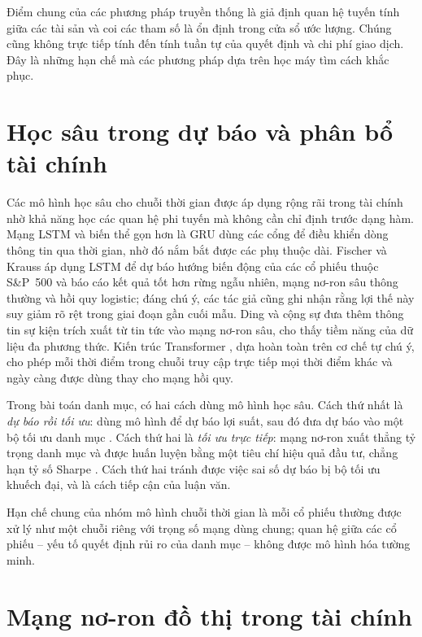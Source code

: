 Điểm chung của các phương pháp truyền thống là giả định quan hệ tuyến tính giữa các tài sản và coi các tham số là ổn định trong cửa sổ ước lượng. Chúng cũng không trực tiếp tính đến tính tuần tự của quyết định và chi phí giao dịch. Đây là những hạn chế mà các phương pháp dựa trên học máy tìm cách khắc phục.

\section{Học sâu trong dự báo và phân bổ tài chính}

Các mô hình học sâu cho chuỗi thời gian được áp dụng rộng rãi trong tài chính nhờ khả năng học các quan hệ phi tuyến mà không cần chỉ định trước dạng hàm. Mạng LSTM \cite{hochreiter1997} và biến thể gọn hơn là GRU \cite{cho2014} dùng các cổng để điều khiển dòng thông tin qua thời gian, nhờ đó nắm bắt được các phụ thuộc dài. Fischer và Krauss \cite{fischer2018} áp dụng LSTM để dự báo hướng biến động của các cổ phiếu thuộc S\&P~500 và báo cáo kết quả tốt hơn rừng ngẫu nhiên, mạng nơ-ron sâu thông thường và hồi quy logistic; đáng chú ý, các tác giả cũng ghi nhận rằng lợi thế này suy giảm rõ rệt trong giai đoạn gần cuối mẫu. Ding và cộng sự \cite{ding2015} đưa thêm thông tin sự kiện trích xuất từ tin tức vào mạng nơ-ron sâu, cho thấy tiềm năng của dữ liệu đa phương thức. Kiến trúc Transformer \cite{vaswani2017}, dựa hoàn toàn trên cơ chế tự chú ý, cho phép mỗi thời điểm trong chuỗi truy cập trực tiếp mọi thời điểm khác và ngày càng được dùng thay cho mạng hồi quy.

Trong bài toán danh mục, có hai cách dùng mô hình học sâu. Cách thứ nhất là \emph{dự báo rồi tối ưu}: dùng mô hình để dự báo lợi suất, sau đó đưa dự báo vào một bộ tối ưu danh mục \cite{ma2023}. Cách thứ hai là \emph{tối ưu trực tiếp}: mạng nơ-ron xuất thẳng tỷ trọng danh mục và được huấn luyện bằng một tiêu chí hiệu quả đầu tư, chẳng hạn tỷ số Sharpe \cite{zhang2020}. Cách thứ hai tránh được việc sai số dự báo bị bộ tối ưu khuếch đại, và là cách tiếp cận của luận văn.

Hạn chế chung của nhóm mô hình chuỗi thời gian là mỗi cổ phiếu thường được xử lý như một chuỗi riêng với trọng số mạng dùng chung; quan hệ giữa các cổ phiếu -- yếu tố quyết định rủi ro của danh mục -- không được mô hình hóa tường minh.

\section{Mạng nơ-ron đồ thị trong tài chính}

